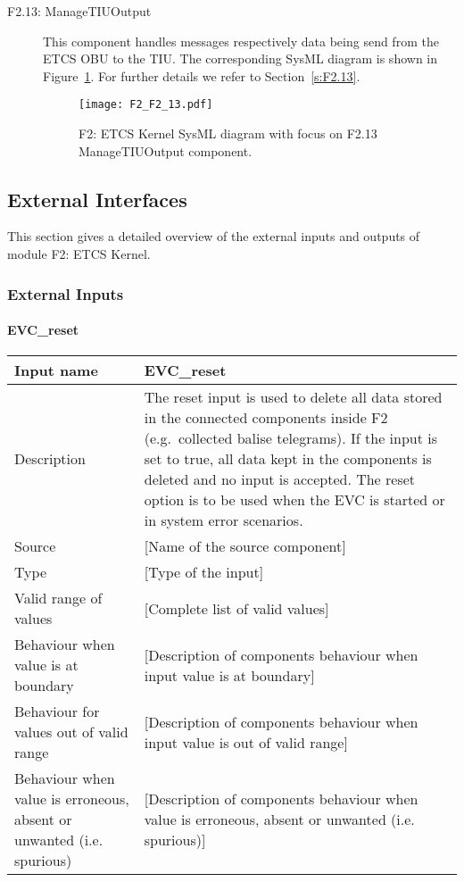 \begin{description}
\item[F2.13: ManageTIUOutput] This component handles messages respectively data being send from the ETCS OBU to the TIU. The corresponding SysML diagram is shown in Figure~\ref{f:f2.13_overview}. For further details we refer to Section~\ref{s:F2.13}.
\begin{figure}
\center
\texttt{[image: F2\_F2\_13.pdf]}
\caption{F2: ETCS Kernel SysML diagram with focus on F2.13 ManageTIUOutput component.}\label{f:f2.13_overview}
\end{figure}
\end{description}


\subsection{External Interfaces}
This section gives a detailed overview of the external inputs and outputs of module F2: ETCS Kernel.

\subsubsection{External Inputs}

\paragraph{EVC\_reset}

\begin{longtable}{p{}p{}}
\toprule
Input name				& EVC\_reset \\
\midrule
Description				&  The reset input is used to delete all data stored in the connected components inside F2 (e.g.~collected balise telegrams). If the input is set to true, all data kept in the components is deleted and no input is accepted. The reset option is to be used when the EVC is started or in system error scenarios. \\
\midrule
Source					& [Name of the source component] \\ 
\midrule
Type					& [Type of the input] \\
\midrule
Valid range of values	& [Complete list of valid values] \\
\midrule
Behaviour when value is at boundary	& [Description of components behaviour when input value is at boundary] \\
\midrule
Behaviour for values out of valid range	& [Description of components behaviour when input value is out of valid range] \\
\midrule
Behaviour when value is erroneous, absent or unwanted (i.e. spurious) & [Description of components behaviour when value is erroneous, absent or unwanted (i.e. spurious)] \\
\bottomrule
\end{longtable}

